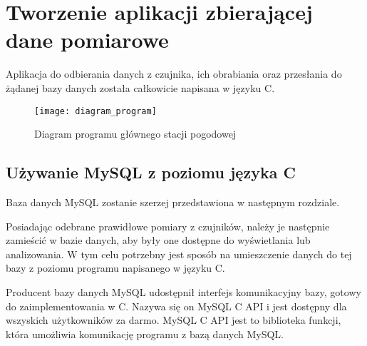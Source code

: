 \chapter{Tworzenie aplikacji zbierającej dane pomiarowe}

Aplikacja do odbierania danych z czujnika, ich obrabiania oraz przesłania do żądanej bazy danych została całkowicie napisana w języku C.

\begin{figure}[h]
\centering
\texttt{[image: diagram\_program]}
\caption{Diagram programu głównego stacji pogodowej}
\label{fig:diagram_program}
\end{figure}

\section*{Używanie MySQL z poziomu języka C}
Baza danych MySQL zostanie szerzej przedstawiona w następnym rozdziale.

Posiadając odebrane prawidłowe pomiary z czujników, należy je następnie zamieścić w bazie danych, aby były one dostępne do wyświetlania lub analizowania. W tym celu potrzebny jest sposób na umieszczenie danych do tej bazy z poziomu programu napisanego w języku C.

Producent bazy danych MySQL udostępnił interfejs komunikacyjny bazy, gotowy do zaimplementowania w C. Nazywa się on MySQL C API i jest dostępny dla wszyskich użytkowników za darmo. MySQL C API jest to biblioteka funkcji, która umożliwia komunikację programu z bazą danych MySQL.




